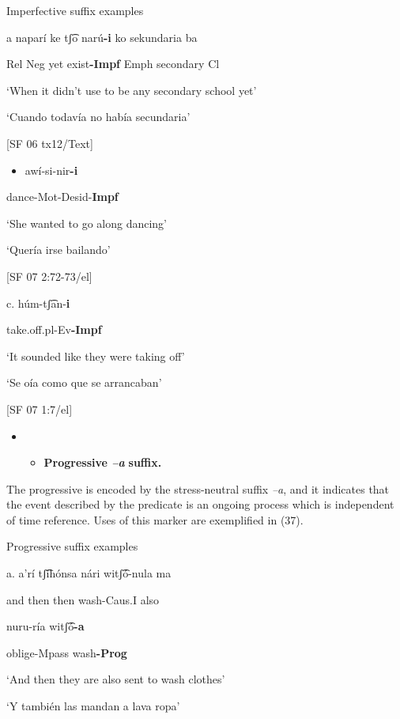    Imperfective suffix examples

a   naparí   ke   tʃ͡o   narú\textbf{{}-i}     ko   sekundaria   ba

Rel   Neg   yet   exist\textbf{{}-Impf}   Emph   secondary   Cl

‘When it didn’t use to be any secondary school yet’

‘Cuando todavía no había secundaria’    

[SF 06 tx12/Text]


\begin{itemize}
\item    awí-si-nir\textbf{{}-i}
\end{itemize}

dance-Mot-Desid-\textbf{Impf}

    ‘She wanted to go along dancing’

    ‘Quería irse bailando’          

    [SF 07 2:72-73/el]

c.  húm-tʃ͡an-\textbf{i}    

            take.off.pl-Ev\textbf{{}-Impf}

    ‘It sounded like they were taking off’

    ‘Se oía como que se arrancaban’      

    [SF 07 1:7/el]


\begin{itemize}
\item \begin{itemize}
\item \textbf{Progressive \textit{–a} }\textbf{suffix.}
\end{itemize}
\end{itemize}

The progressive is encoded by the stress-neutral suffix \textit{–a}, and it indicates that the event described by the predicate is an ongoing process which is independent of time reference. Uses of this marker are exemplified in (37).


   Progressive suffix examples

  a.   a’rí    tʃ͡ihónsa  nári  witʃ͡ó-nula   ma  

and   then     then    wash-Caus.I   also   

nuru-ría   witʃ͡ó\textbf{{}-a}

oblige-Mpass  wash\textbf{{}-Prog} 

‘And then they are also sent to wash clothes’

‘Y también las mandan a lava ropa’      

